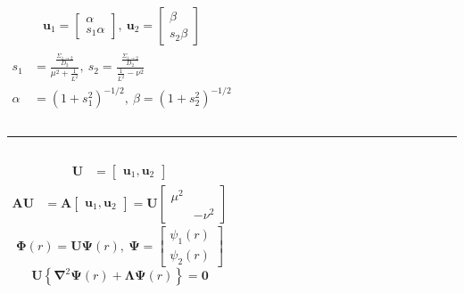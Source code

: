 \documentclass[handout,10pt]{beamer}
\begin{document}
\begin{frame}
\begin{columns}
\begin{align*}
    \begin{split}
        \pmb{u}_1 = \begin{bmatrix}
            \alpha \\
            s_1\alpha
        \end{bmatrix},\ 
        \pmb{u}_2 = \begin{bmatrix}
            \beta \\
            s_2\beta
        \end{bmatrix}
    \end{split}
\end{align*}
\begin{align*}
    s_1 &= \frac{\frac{\Sigma_{1\rightarrow 2}}{D_2}}{\mu^2 + \frac{1}{L^2}},\ s_2 = \frac{\frac{\Sigma_{1\rightarrow 2}}{D_2}}{\frac{1}{L^2}-\nu^2} \\
    \alpha &= \left(1+s_1^2\right)^{-1/2},\ \beta = \left(1+s_2^2\right)^{-1/2}
\end{align*}
\end{columns}
\noindent\rule{\textwidth}{0.5pt}
\begin{columns}
\begin{align*}
    \pmb{U} &= \begin{bmatrix}
        \pmb{u}_1, \pmb{u}_2
    \end{bmatrix}
\end{align*}
\begin{align*}
    \pmb{A}\pmb{U} &= \pmb{A}\begin{bmatrix}
        \pmb{u}_1, \pmb{u}_2
    \end{bmatrix}= \pmb{U}\begin{bmatrix}
        \mu^2 & \\
         & -\nu^2
    \end{bmatrix}
\end{align*}
\begin{equation*}
    \pmb{\Phi}(r) = \pmb{U}\pmb{\Psi}(r),\ 
    \pmb{\Psi} = \begin{bmatrix}
        \psi_1(r) \\
        \psi_2(r)
    \end{bmatrix}
\end{equation*}
\begin{equation*}
    \pmb{U}\left\{\pmb{\nabla}^2\pmb{\Psi}(r)+\pmb{\Lambda}\pmb{\Psi}(r)\right\} = \pmb{0}
\end{equation*}
\end{columns}
\normalsize
\end{frame}
\end{document}
